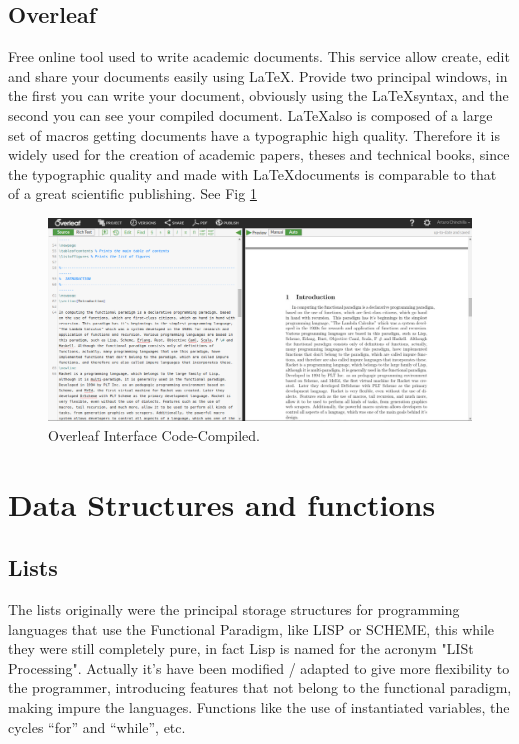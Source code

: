 \documentclass[12pt]{article}
\begin{document}
\begin{itemize}
\subsection{Overleaf}
Free online tool used to write academic documents. This service allow create, edit and share your documents easily using \LaTeX. Provide two principal windows, in the first you can write your document, obviously using the \LaTeX syntax, and the second you can see your compiled document. \LaTeX also is composed of a large set of macros getting documents have a typographic high quality. Therefore it is widely used for the creation of academic papers, theses and technical books, since the typographic quality and made with \LaTeX documents is comparable to that of a great scientific publishing. See Fig \ref{overleaf}
\begin{figure}[h!]
 	\centering
  	\includegraphics[scale=0.3]
  	{Images/overleaf.png}
  	\caption{Overleaf Interface Code-Compiled.}
     \label{overleaf}
\end{figure}


\section{Data Structures and functions}
\subsection{Lists}
The lists originally were the principal storage structures for programming languages that use the Functional Paradigm, like LISP or SCHEME, this while they were still completely pure, in fact Lisp is named for the acronym "LISt Processing".  Actually it's have been modified / adapted to give more flexibility to the programmer, introducing features that not belong to the functional paradigm, making impure the languages. Functions like the use of instantiated variables, the cycles “for” and “while”, etc.

\end{itemize}
\end{document}
